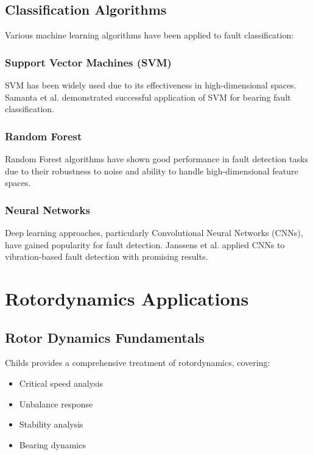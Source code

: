 \subsection{Classification Algorithms}

Various machine learning algorithms have been applied to fault classification:

\subsubsection{Support Vector Machines (SVM)}

SVM has been widely used due to its effectiveness in high-dimensional spaces. Samanta et al. \cite{samanta2003artificial} demonstrated successful application of SVM for bearing fault classification.

\subsubsection{Random Forest}

Random Forest algorithms have shown good performance in fault detection tasks due to their robustness to noise and ability to handle high-dimensional feature spaces.

\subsubsection{Neural Networks}

Deep learning approaches, particularly Convolutional Neural Networks (CNNs), have gained popularity for fault detection. Janssens et al. \cite{janssens2016convolutional} applied CNNs to vibration-based fault detection with promising results.

\section{Rotordynamics Applications}

\subsection{Rotor Dynamics Fundamentals}

Childs \cite{childs1993turbomachinery} provides a comprehensive treatment of rotordynamics, covering:

\begin{itemize}
    \item Critical speed analysis
    \item Unbalance response
    \item Stability analysis
    \item Bearing dynamics
\end{itemize}

